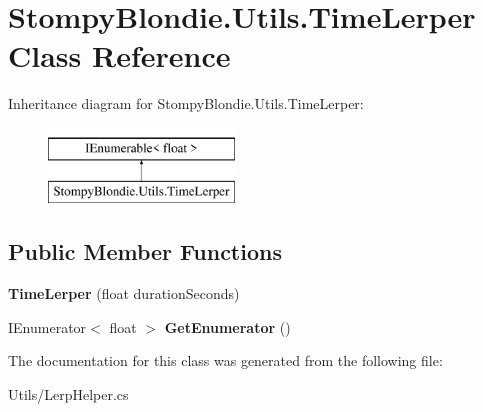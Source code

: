 \hypertarget{class_stompy_blondie_1_1_utils_1_1_time_lerper}{}\section{Stompy\+Blondie.\+Utils.\+Time\+Lerper Class Reference}
\label{class_stompy_blondie_1_1_utils_1_1_time_lerper}
Inheritance diagram for Stompy\+Blondie.\+Utils.\+Time\+Lerper\+:\begin{figure}[H]
\begin{center}
\leavevmode
\includegraphics[height=2.000000cm]{class_stompy_blondie_1_1_utils_1_1_time_lerper}
\end{center}
\end{figure}
\subsection*{Public Member Functions}
\begin{DoxyCompactItemize}
\item 
\mbox{\label{class_stompy_blondie_1_1_utils_1_1_time_lerper_a921b38718ec7717d1aa4ba43e932a067}} 
{\bfseries Time\+Lerper} (float duration\+Seconds)
\item 
\mbox{\label{class_stompy_blondie_1_1_utils_1_1_time_lerper_a94f254b4f590804aaa2acbb2f6fb51c9}} 
I\+Enumerator$<$ float $>$ {\bfseries Get\+Enumerator} ()
\end{DoxyCompactItemize}


The documentation for this class was generated from the following file\+:\begin{DoxyCompactItemize}
\item 
Utils/Lerp\+Helper.\+cs\end{DoxyCompactItemize}
